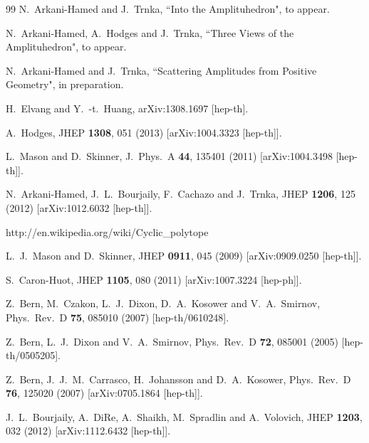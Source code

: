\documentclass[12pt,nohyper,twosided]{JHEP3}
\begin{document}
\begin{thebibliography}{99}
N.~Arkani-Hamed and J.~Trnka, ``Into the Amplituhedron", to appear.

N.~Arkani-Hamed, A.~Hodges and J.~Trnka, ``Three Views of the
Amplituhedron", to appear.

 N.~Arkani-Hamed and J.~Trnka, ``Scattering Amplitudes from Positive Geometry", in
preparation.

  H.~Elvang and Y.~-t.~Huang,
  arXiv:1308.1697 [hep-th].

  A.~Hodges,
  JHEP {\bf 1308}, 051 (2013)
  [arXiv:1004.3323 [hep-th]].

  L.~Mason and D.~Skinner,
  J.\ Phys.\ A {\bf 44}, 135401 (2011)
  [arXiv:1004.3498 [hep-th]].

  N.~Arkani-Hamed, J.~L.~Bourjaily, F.~Cachazo and J.~Trnka,
  JHEP {\bf 1206}, 125 (2012)
  [arXiv:1012.6032 [hep-th]].

http://en.wikipedia.org/wiki/Cyclic\_polytope

  L.~J.~Mason and D.~Skinner,
  JHEP {\bf 0911}, 045 (2009)
  [arXiv:0909.0250 [hep-th]].

  S.~Caron-Huot,
  JHEP {\bf 1105}, 080 (2011)
  [arXiv:1007.3224 [hep-ph]].

  Z.~Bern, M.~Czakon, L.~J.~Dixon, D.~A.~Kosower and V.~A.~Smirnov,
  Phys.\ Rev.\ D {\bf 75}, 085010 (2007)
  [hep-th/0610248].

  Z.~Bern, L.~J.~Dixon and V.~A.~Smirnov,
  Phys.\ Rev.\ D {\bf 72}, 085001 (2005)
  [hep-th/0505205].

  Z.~Bern, J.~J.~M.~Carrasco, H.~Johansson and D.~A.~Kosower,
  Phys.\ Rev.\ D {\bf 76}, 125020 (2007)
  [arXiv:0705.1864 [hep-th]].

  J.~L.~Bourjaily, A.~DiRe, A.~Shaikh, M.~Spradlin and A.~Volovich,
  JHEP {\bf 1203}, 032 (2012)
  [arXiv:1112.6432 [hep-th]].


\end{thebibliography}
\end{document}
